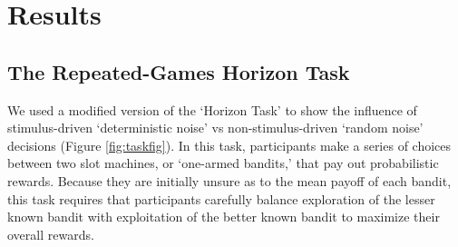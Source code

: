 \documentclass[12pt]{article}
\begin{document}
	\section*{Results}

	\subsection*{The Repeated-Games Horizon Task}
	We used a modified version of the `Horizon Task' \citep{wilson2014} to show the influence of stimulus-driven `deterministic noise' vs non-stimulus-driven `random noise'  decisions (Figure \ref{fig:taskfig}). In this task, participants make a series of  choices between two slot machines, or `one-armed bandits,' that pay out probabilistic rewards. Because they are initially unsure as to the mean payoff of each bandit, this task requires that participants carefully balance exploration of the lesser known bandit with exploitation of the better known bandit to maximize their overall rewards. 
	
\end{document}

